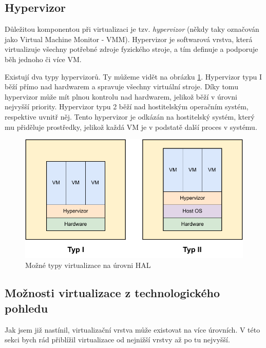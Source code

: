 \subsection{Hypervizor}

Důležitou komponentou při virtualizaci je tzv. \textit{hypervizor} (někdy taky označován jako Virtual Machine Monitor - VMM). Hypervizor je softwarová vrstva, která virtualizuje všechny potřebné zdroje fyzického stroje, a tím definuje a podporuje běh jednoho či více VM. \cite{whitaker2002denali}

Existují dva typy hypervizorů. Ty můžeme vidět na obrázku \ref{fig:vm_types}. Hypervizor typu I běží přímo nad hardwarem a spravuje všechny virtuální stroje. Díky tomu hypervizor může mít plnou kontrolu nad hardwarem, jelikož běží v úrovni nejvyšší priority. Hypervizor typu 2 běží nad hostitelským operačním systém, respektive uvnitř něj. Tento hypervizor je odkázán na hostitelský systém, který mu přiděluje prostředky, jelikož každá VM je v podstatě další proces v systému.\cite{chiueh2005survey}\cite{RODRIGUEZHARO2012267}

\begin{figure}[htbp]
    \centering 
    \includegraphics[width=\textwidth]{assets/img/vm_types.pdf}
    \caption{Možné typy virtualizace na úrovni HAL}
    \label{fig:vm_types}
\end{figure}

\subsection{Možnosti virtualizace z technologického pohledu}

Jak jsem již nastínil, virtualizační vrstva může existovat na více úrovních. V této sekci bych rád přiblížil virtualizace od nejnižší vrstvy až po tu nejvyšší.

